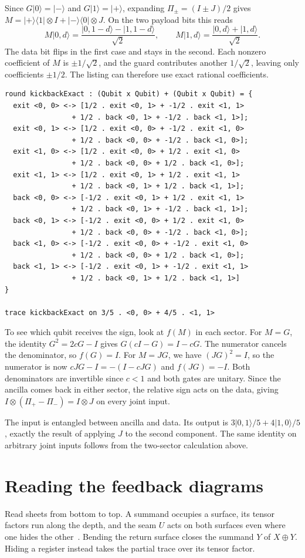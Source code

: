 \documentclass[acmsmall,screen,review,anonymous,nonacm]{acmart}
\newcommand{\ket}[1]{\lvert #1\rangle}
\newcommand{\bra}[1]{\langle #1\rvert}
\numberwithin{equation}{section}
\begin{document}
Since $G\ket0=\ket-$ and $G\ket1=\ket+$, expanding $\Pi_\pm=(I\pm J)/2$ gives $M=\ket+\bra1\otimes I+\ket-\bra0\otimes J$. On the two payload bits this reads
\[
M\ket{0,d}=\frac{\ket{0,1-d}-\ket{1,1-d}}{\sqrt2},\qquad
M\ket{1,d}=\frac{\ket{0,d}+\ket{1,d}}{\sqrt2}.
\]
The data bit flips in the first case and stays in the second.
Each nonzero coefficient of $M$ is $\pm1/\sqrt2$, and the guard
contributes another $1/\sqrt2$, leaving only coefficients $\pm1/2$.
The listing can therefore use exact rational coefficients.
\begin{lstlisting}
round kickbackExact : (Qubit x Qubit) + (Qubit x Qubit) = {
  exit <0, 0> <-> [1/2 . exit <0, 1> + -1/2 . exit <1, 1>
                + 1/2 . back <0, 1> + -1/2 . back <1, 1>];
  exit <0, 1> <-> [1/2 . exit <0, 0> + -1/2 . exit <1, 0>
                + 1/2 . back <0, 0> + -1/2 . back <1, 0>];
  exit <1, 0> <-> [1/2 . exit <0, 0> + 1/2 . exit <1, 0>
                + 1/2 . back <0, 0> + 1/2 . back <1, 0>];
  exit <1, 1> <-> [1/2 . exit <0, 1> + 1/2 . exit <1, 1>
                + 1/2 . back <0, 1> + 1/2 . back <1, 1>];
  back <0, 0> <-> [-1/2 . exit <0, 1> + 1/2 . exit <1, 1>
                + 1/2 . back <0, 1> + -1/2 . back <1, 1>];
  back <0, 1> <-> [-1/2 . exit <0, 0> + 1/2 . exit <1, 0>
                + 1/2 . back <0, 0> + -1/2 . back <1, 0>];
  back <1, 0> <-> [-1/2 . exit <0, 0> + -1/2 . exit <1, 0>
                + 1/2 . back <0, 0> + 1/2 . back <1, 0>];
  back <1, 1> <-> [-1/2 . exit <0, 1> + -1/2 . exit <1, 1>
                + 1/2 . back <0, 1> + 1/2 . back <1, 1>]
}

trace kickbackExact on 3/5 . <0, 0> + 4/5 . <1, 1>
\end{lstlisting}

To see which qubit receives the sign, look at $f(M)$ in each sector.
For $M=G$, the identity $G^2=2cG-I$ gives $G(cI-G)=I-cG$.
The numerator cancels the denominator, so $f(G)=I$.
For $M=JG$, we have $(JG)^2=I$, so the numerator is now
$cJG-I=-(I-cJG)$ and $f(JG)=-I$. Both denominators are invertible
since $c<1$ and both gates are unitary. Since the ancilla comes back in either sector, the relative sign
acts on the data, giving
$I\otimes(\Pi_+-\Pi_-)=I\otimes J$ on every joint input.

The input is entangled between ancilla and data. Its output is
$3\ket{0,1}/5+4\ket{1,0}/5$, exactly the result of applying $J$ to
the second component. The same identity on arbitrary joint inputs
follows from the two-sector calculation above.

\section{Reading the feedback diagrams}\label{app:diagrams}
Read sheets from bottom to top. A summand occupies a surface, its tensor
factors run along the depth, and the seam $U$ acts on both surfaces even
where one hides the other~\cite[Defs.~16, 18--20, 22]{ComfortDelpeuchHedges20Sheets}.
Bending the return surface closes the summand $Y$ of $X\oplus Y$. Hiding a
register instead takes the partial trace over its tensor factor.
\end{document}
